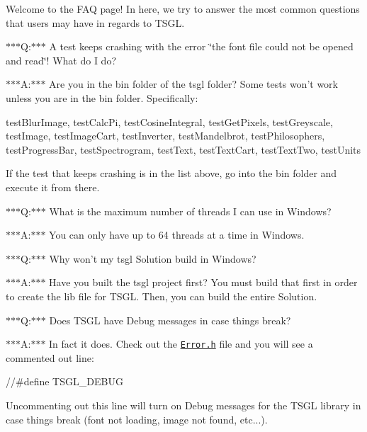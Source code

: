 Welcome to the F\-A\-Q page! In here, we try to answer the most common questions that users may have in regards to T\-S\-G\-L.

$\ast$$\ast$$\ast$\-Q\-:$\ast$$\ast$$\ast$ A test keeps crashing with the error \char`\"{}the font file could not be opened and read\char`\"{}! What do I do?

$\ast$$\ast$$\ast$\-A\-:$\ast$$\ast$$\ast$ Are you in the bin folder of the tsgl folder? Some tests won't work unless you are in the bin folder. Specifically\-:

{\ttfamily test\-Blur\-Image}, {\ttfamily test\-Calc\-Pi}, {\ttfamily test\-Cosine\-Integral}, {\ttfamily test\-Get\-Pixels}, {\ttfamily test\-Greyscale}, {\ttfamily test\-Image}, {\ttfamily test\-Image\-Cart}, {\ttfamily test\-Inverter}, {\ttfamily test\-Mandelbrot}, {\ttfamily test\-Philosophers}, {\ttfamily test\-Progress\-Bar}, {\ttfamily test\-Spectrogram}, {\ttfamily test\-Text}, {\ttfamily test\-Text\-Cart}, {\ttfamily test\-Text\-Two}, {\ttfamily test\-Units}

If the test that keeps crashing is in the list above, go into the bin folder and execute it from there.

$\ast$$\ast$$\ast$\-Q\-:$\ast$$\ast$$\ast$ What is the maximum number of threads I can use in Windows?

$\ast$$\ast$$\ast$\-A\-:$\ast$$\ast$$\ast$ You can only have up to 64 threads at a time in Windows.

$\ast$$\ast$$\ast$\-Q\-:$\ast$$\ast$$\ast$ Why won't my tsgl Solution build in Windows?

$\ast$$\ast$$\ast$\-A\-:$\ast$$\ast$$\ast$ Have you built the tsgl project first? You must build that first in order to create the lib file for T\-S\-G\-L. Then, you can build the entire Solution.

$\ast$$\ast$$\ast$\-Q\-:$\ast$$\ast$$\ast$ Does T\-S\-G\-L have Debug messages in case things break?

$\ast$$\ast$$\ast$\-A\-:$\ast$$\ast$$\ast$ In fact it does. Check out the \href{http://calvin-cs.github.io/TSGL/html/_error_8h_source.html}{\tt Error.\-h} file and you will see a commented out line\-:


\begin{DoxyCode}
\textcolor{comment}{//#define TSGL\_DEBUG}
\end{DoxyCode}


Uncommenting out this line will turn on Debug messages for the T\-S\-G\-L library in case things break (font not loading, image not found, etc...).

